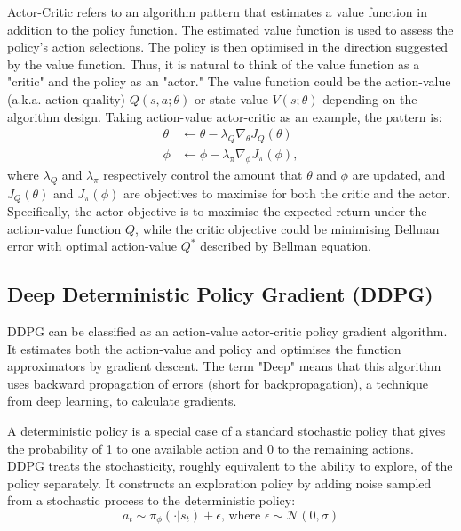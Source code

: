 {Actor-Critic refers to an algorithm pattern that estimates a value function in addition to the policy function. The estimated value function is used to assess the policy's action selections. The policy is then optimised in the direction suggested by the value function. Thus, it is natural to think of the value function as a "critic" and the policy as an "actor." The value function could be the action-value (a.k.a. action-quality) $Q(s,a;\theta)$ or state-value $V(s;\theta)$ depending on the algorithm design. Taking action-value actor-critic as an example, the pattern is:
\begin{align*}
\theta &\gets \theta - \lambda_Q\nabla_{\theta}J_Q(\theta) \\
\phi &\gets \phi - \lambda_\pi\nabla_{\phi}J_\pi(\phi),
\end{align*}
where $\lambda_Q$ and $\lambda_\pi$ respectively control the amount that $\theta$ and $\phi$ are updated, and $J_Q(\theta)$ and $J_\pi(\phi)$ are objectives to maximise for both the critic and the actor. Specifically, the actor objective is to maximise the expected return under the action-value function $Q$, while the critic objective could be minimising Bellman error with optimal action-value $Q^*$ described by Bellman equation.

\subsection{Deep Deterministic Policy Gradient (DDPG)}

DDPG can be classified as an action-value actor-critic policy gradient algorithm. It estimates both the action-value and policy and optimises the function approximators by gradient descent. The term "Deep" means that this algorithm uses backward propagation of errors (short for backpropagation), a technique from deep learning, to calculate gradients.

A deterministic policy is a special case of a standard stochastic policy that gives the probability of 1 to one available action and 0 to the remaining actions. DDPG treats the stochasticity, roughly equivalent to the ability to explore, of the policy separately. It constructs an exploration policy by adding noise sampled from a stochastic process to the deterministic policy:
\begin{displaymath}
a_t \sim \pi_\phi(\cdot|s_t) + \epsilon\text{, where } \epsilon \sim \mathcal{N}(0,\sigma)
\end{displaymath}

}

